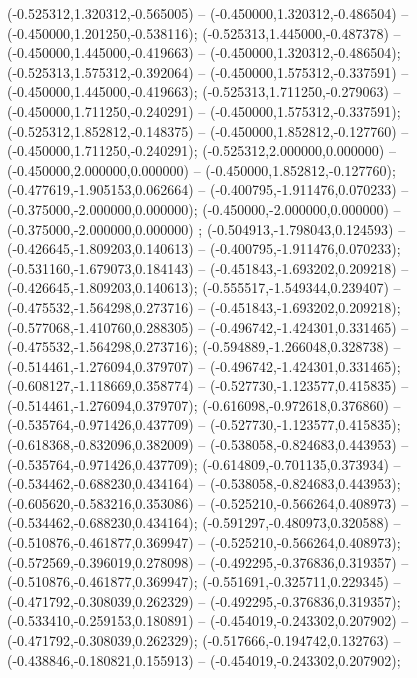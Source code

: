  (-0.525312,1.320312,-0.565005) -- (-0.450000,1.320312,-0.486504) -- (-0.450000,1.201250,-0.538116);
 (-0.525313,1.445000,-0.487378) -- (-0.450000,1.445000,-0.419663) -- (-0.450000,1.320312,-0.486504);
 (-0.525313,1.575312,-0.392064) -- (-0.450000,1.575312,-0.337591) -- (-0.450000,1.445000,-0.419663);
 (-0.525313,1.711250,-0.279063) -- (-0.450000,1.711250,-0.240291) -- (-0.450000,1.575312,-0.337591);
 (-0.525312,1.852812,-0.148375) -- (-0.450000,1.852812,-0.127760) -- (-0.450000,1.711250,-0.240291);
 (-0.525312,2.000000,0.000000) -- (-0.450000,2.000000,0.000000) -- (-0.450000,1.852812,-0.127760);
 (-0.477619,-1.905153,0.062664) -- (-0.400795,-1.911476,0.070233) -- (-0.375000,-2.000000,0.000000);
 (-0.450000,-2.000000,0.000000) -- (-0.375000,-2.000000,0.000000) ;
 (-0.504913,-1.798043,0.124593) -- (-0.426645,-1.809203,0.140613) -- (-0.400795,-1.911476,0.070233);
 (-0.531160,-1.679073,0.184143) -- (-0.451843,-1.693202,0.209218) -- (-0.426645,-1.809203,0.140613);
 (-0.555517,-1.549344,0.239407) -- (-0.475532,-1.564298,0.273716) -- (-0.451843,-1.693202,0.209218);
 (-0.577068,-1.410760,0.288305) -- (-0.496742,-1.424301,0.331465) -- (-0.475532,-1.564298,0.273716);
 (-0.594889,-1.266048,0.328738) -- (-0.514461,-1.276094,0.379707) -- (-0.496742,-1.424301,0.331465);
 (-0.608127,-1.118669,0.358774) -- (-0.527730,-1.123577,0.415835) -- (-0.514461,-1.276094,0.379707);
 (-0.616098,-0.972618,0.376860) -- (-0.535764,-0.971426,0.437709) -- (-0.527730,-1.123577,0.415835);
 (-0.618368,-0.832096,0.382009) -- (-0.538058,-0.824683,0.443953) -- (-0.535764,-0.971426,0.437709);
 (-0.614809,-0.701135,0.373934) -- (-0.534462,-0.688230,0.434164) -- (-0.538058,-0.824683,0.443953);
 (-0.605620,-0.583216,0.353086) -- (-0.525210,-0.566264,0.408973) -- (-0.534462,-0.688230,0.434164);
 (-0.591297,-0.480973,0.320588) -- (-0.510876,-0.461877,0.369947) -- (-0.525210,-0.566264,0.408973);
 (-0.572569,-0.396019,0.278098) -- (-0.492295,-0.376836,0.319357) -- (-0.510876,-0.461877,0.369947);
 (-0.551691,-0.325711,0.229345) -- (-0.471792,-0.308039,0.262329) -- (-0.492295,-0.376836,0.319357);
 (-0.533410,-0.259153,0.180891) -- (-0.454019,-0.243302,0.207902) -- (-0.471792,-0.308039,0.262329);
 (-0.517666,-0.194742,0.132763) -- (-0.438846,-0.180821,0.155913) -- (-0.454019,-0.243302,0.207902);
